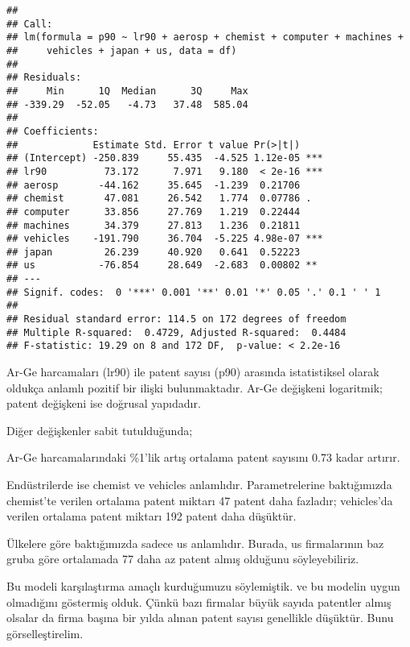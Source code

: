 \documentclass[
]{book}
\newenvironment{Shaded}{\begin{snugshade}}{\end{snugshade}}
\newcommand{\DataTypeTok}[1]{\textcolor[rgb]{0.13,0.29,0.53}{#1}}
\newcommand{\DecValTok}[1]{\textcolor[rgb]{0.00,0.00,0.81}{#1}}
\newcommand{\KeywordTok}[1]{\textcolor[rgb]{0.13,0.29,0.53}{\textbf{#1}}}
\newcommand{\NormalTok}[1]{#1}
\newcommand{\OperatorTok}[1]{\textcolor[rgb]{0.81,0.36,0.00}{\textbf{#1}}}
\newcommand{\StringTok}[1]{\textcolor[rgb]{0.31,0.60,0.02}{#1}}
\begin{document}
\begin{verbatim}
## 
## Call:
## lm(formula = p90 ~ lr90 + aerosp + chemist + computer + machines + 
##     vehicles + japan + us, data = df)
## 
## Residuals:
##     Min      1Q  Median      3Q     Max 
## -339.29  -52.05   -4.73   37.48  585.04 
## 
## Coefficients:
##             Estimate Std. Error t value Pr(>|t|)    
## (Intercept) -250.839     55.435  -4.525 1.12e-05 ***
## lr90          73.172      7.971   9.180  < 2e-16 ***
## aerosp       -44.162     35.645  -1.239  0.21706    
## chemist       47.081     26.542   1.774  0.07786 .  
## computer      33.856     27.769   1.219  0.22444    
## machines      34.379     27.813   1.236  0.21811    
## vehicles    -191.790     36.704  -5.225 4.98e-07 ***
## japan         26.239     40.920   0.641  0.52223    
## us           -76.854     28.649  -2.683  0.00802 ** 
## ---
## Signif. codes:  0 '***' 0.001 '**' 0.01 '*' 0.05 '.' 0.1 ' ' 1
## 
## Residual standard error: 114.5 on 172 degrees of freedom
## Multiple R-squared:  0.4729, Adjusted R-squared:  0.4484 
## F-statistic: 19.29 on 8 and 172 DF,  p-value: < 2.2e-16
\end{verbatim}

Ar-Ge harcamaları (lr90) ile patent sayısı (p90) arasında istatistiksel olarak oldukça anlamlı pozitif bir ilişki bulunmaktadır. Ar-Ge değişkeni logaritmik; patent değişkeni ise doğrusal yapıdadır.

Diğer değişkenler sabit tutulduğunda;

Ar-Ge harcamalarındaki \%1'lik artış ortalama patent sayısını 0.73 kadar artırır.

Endüstrilerde ise chemist ve vehicles anlamlıdır. Parametrelerine baktığımızda chemist'te verilen ortalama patent miktarı 47 patent daha fazladır; vehicles'da verilen ortalama patent miktarı 192 patent daha düşüktür.

Ülkelere göre baktığımızda sadece us anlamlıdır. Burada, us firmalarının baz gruba göre ortalamada 77 daha az patent almış olduğunu söyleyebiliriz.

Bu modeli karşılaştırma amaçlı kurduğumuzu söylemiştik. ve bu modelin uygun olmadığını göstermiş olduk. Çünkü bazı firmalar büyük sayıda patentler almış olsalar da firma başına bir yılda alınan patent sayısı genellikle düşüktür. Bunu görselleştirelim.

\begin{Shaded}
\end{Shaded}
\end{document}
